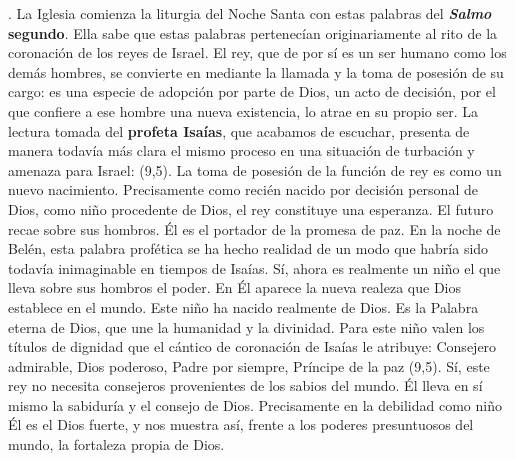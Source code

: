 . La Iglesia comienza la liturgia del Noche Santa con estas palabras del \textbf{\emph{Salmo} segundo}. Ella sabe que estas palabras pertenecían originariamente al rito de la coronación de los reyes de Israel. El rey, que de por sí es un ser humano como los demás hombres, se convierte en  mediante la llamada y la toma de posesión de su cargo: es una especie de adopción por parte de Dios, un acto de decisión, por el que confiere a ese hombre una nueva existencia, lo atrae en su propio ser. La lectura tomada del \textbf{profeta Isaías}, que acabamos de escuchar, presenta de manera todavía más clara el mismo proceso en una situación de turbación y amenaza para Israel:  (9,5). La toma de posesión de la función de rey es como un nuevo nacimiento. Precisamente como recién nacido por decisión personal de Dios, como niño procedente de Dios, el rey constituye una esperanza. El futuro recae sobre sus hombros. Él es el portador de la promesa de paz. En la noche de Belén, esta palabra profética se ha hecho realidad de un modo que habría sido todavía inimaginable en tiempos de Isaías. Sí, ahora es realmente un niño el que lleva sobre sus hombros el poder. En Él aparece la nueva realeza que Dios establece en el mundo. Este niño ha nacido realmente de Dios. Es la Palabra eterna de Dios, que une la humanidad y la divinidad. Para este niño valen los títulos de dignidad que el cántico de coronación de Isaías le atribuye: Consejero admirable, Dios poderoso, Padre por siempre, Príncipe de la paz (9,5). Sí, este rey no necesita consejeros provenientes de los sabios del mundo. Él lleva en sí mismo la sabiduría y el consejo de Dios. Precisamente en la debilidad como niño Él es el Dios fuerte, y nos muestra así, frente a los poderes presuntuosos del mundo, la fortaleza propia de Dios.

